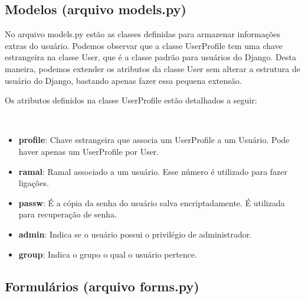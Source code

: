 \documentclass[letterpaper,10pt,brazil]{sphinxmanual}
\begin{document}
\subsection{Modelos (arquivo models.py)}
\label{apps/accounts:module-accounts.models}\label{apps/accounts:modelos-arquivo-models-py}
No arquivo models.py estão as classes definidas para armazenar informações extras do usuário. Podemos observar que a classe UserProfile tem uma chave estrangeira na classe User, que é a classe padrão para usuários do Django. Desta maneira, podemos extender os atributos da classe User sem alterar a estrutura de usuário do Django, bastando apenas fazer essa pequena extensão.

Os atributos definidos na classe UserProfile estão detalhados a seguir:

\begin{fulllineitems}
\label{apps/accounts:accounts.models.UserProfile}~\begin{itemize}
\item {} 
\textbf{profile}: Chave estrangeira que associa um UserProfile a um Usuário. Pode haver apenas um UserProfile por User.

\item {} 
\textbf{ramal}: Ramal associado a um usuário. Esse número é utilizado para fazer ligações.

\item {} 
\textbf{passw}: É a cópia da senha do usuário salva encriptadamente. É utilizada para recuperação de senha.

\item {} 
\textbf{admin}: Indica se o usuário possui o privilégio de administrador.

\item {} 
\textbf{group}: Indica o grupo o qual o usuário pertence.

\end{itemize}

\end{fulllineitems}



\subsection{Formulários (arquivo forms.py)}
\label{apps/accounts:formularios-arquivo-forms-py}\label{apps/accounts:module-accounts.forms}
\end{document}
